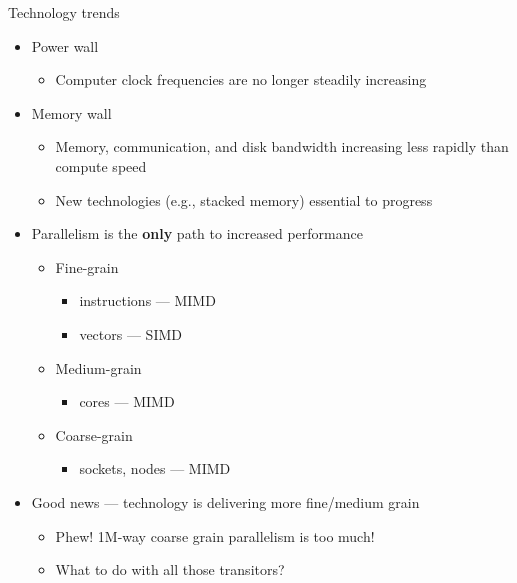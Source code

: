 \begin{frame}{Technology trends}

  \begin{itemize}
  \item Power wall 
    \begin{itemize}
    \item Computer clock frequencies are no longer steadily increasing
    \end{itemize}

  \item Memory wall 
    \begin{itemize}
    \item Memory, communication, and disk bandwidth increasing less rapidly than compute speed
    \item New technologies (e.g., stacked memory) essential to progress
    \end{itemize}
  
  \item Parallelism is the {\bf only} path to increased performance
    \begin{itemize}
    \item Fine-grain
      \begin{itemize}
      \item instructions --- MIMD
      \item vectors --- SIMD
      \end{itemize}

    \item Medium-grain
      \begin{itemize}
      \item cores --- MIMD
      \end{itemize}

    \item Coarse-grain
      \begin{itemize}
      \item sockets, nodes --- MIMD
      \end{itemize}
    \end{itemize}

  \item Good news --- technology is delivering more fine/medium grain
    \begin{itemize}
    \item Phew!  1M-way coarse grain parallelism is too much!
    \item What to do with all those transitors?
    \end{itemize}
  \end{itemize}
\end{frame}

